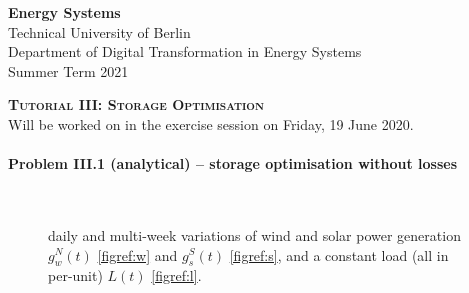 \documentclass[11pt,a4paper,fleqn]{scrartcl}
\begin{document}
\begin{flushright}
      \textbf{Energy Systems}\\
      {\small Technical University of Berlin}\\
      {\small Department of Digital Transformation in Energy Systems}\\
      {\small Summer Term 2021}\\
\end{flushright}

 
 \vspace{-0.5em}
 \hrulefill
 \vspace{0.3em}

\begin{center}
 \textbf{\textsc{\Large Tutorial III: Storage Optimisation}}\\
 \small Will be worked on in the exercise session on Friday, 19 June 2020.\\[1.5em]
\end{center}

\vspace{-0.5em}
\hrulefill
\vspace{0.8em}

\paragraph{Problem III.1 (analytical) -- storage optimisation without losses \faHome}~\\

\begin{wrapfigure}[11]{r}{0pt}
 \caption{daily and multi-week variations of wind and solar power generation
  \(g^{N}_{w}(t)\)
  \autoref{figref:w} and \(g^{S}_{s}(t)\)
  \autoref{figref:s}, and a constant load (all in per-unit) \(L(t)\)
  \autoref{figref:l}.}
 \label{fig:variations}
\end{wrapfigure}
\end{document}
